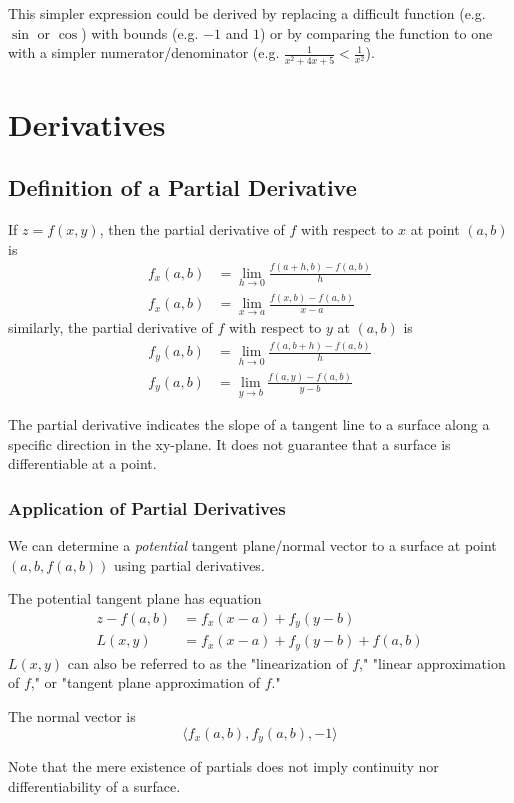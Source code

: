 \documentclass{article}
\begin{document}
This simpler expression could be derived by replacing a difficult function (e.g. $\sin$ or $\cos$) with bounds (e.g. $-1$ and $1$) or by comparing the function to one with a simpler numerator/denominator (e.g. $\frac{1}{x^2+4x+5} < \frac{1}{x^2}$).

\section{Derivatives}
\subsection{Definition of a Partial Derivative}
If $z=f(x,y)$, then the partial derivative of $f$ with respect to $x$ at point $(a,b)$ is
\begin{align*}
    f_x(a,b) &= \lim_{h\to0} \frac{f(a+h,b) - f(a,b)}{h} \\
    f_x(a,b) &= \lim_{x \to a} \frac{f(x,b)-f(a,b)}{x-a}
\end{align*}
similarly, the partial derivative of $f$ with respect to $y$ at $(a,b)$ is
\begin{align*}
    f_y(a,b) &= \lim_{h\to0} \frac{f(a,b+h) - f(a,b)}{h} \\
    f_y(a,b) &= \lim_{y \to b} \frac{f(a,y)-f(a,b)}{y-b}
\end{align*}

The partial derivative indicates the slope of a tangent line to a surface along a specific direction in the xy-plane. It does not guarantee that a surface is differentiable at a point.

\subsubsection{Application of Partial Derivatives}
We can determine a \emph{potential} tangent plane/normal vector to a surface at point $(a,b, f(a,b))$ using partial derivatives.

The potential tangent plane has equation
\begin{align*}
	z - f(a,b) &= f_x(x - a) + f_y(y - b)\\
	L(x,y) &= f_x(x-a) + f_y(y-b) + f(a,b)
\end{align*}
$L(x,y)$ can also be referred to as the "linearization of $f$," "linear approximation of $f$," or "tangent plane approximation of $f$."

The normal vector is
$$\langle f_x(a,b), f_y(a,b), -1 \rangle$$

Note that the mere existence of partials does not imply continuity nor differentiability of a surface.
\end{document}
